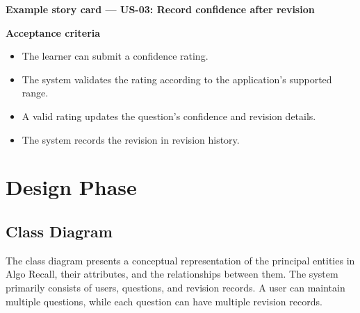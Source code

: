 \documentclass[12pt,a4paper]{report}
\begin{document}
\textbf{Example story card — US-03: Record confidence after revision}

\textbf{Acceptance criteria}
\begin{itemize}
\item The learner can submit a confidence rating.
\item The system validates the rating according to the application's supported range.
\item A valid rating updates the question's confidence and revision details.
\item The system records the revision in revision history.
\end{itemize}


\chapter{Design Phase}


\section{Class Diagram}

The class diagram presents a conceptual representation of
the principal entities in Algo Recall, their attributes,
and the relationships between them. The system primarily
consists of users, questions, and revision records.
A user can maintain multiple questions, while each
question can have multiple revision records.

\needspace{10cm}
\end{document}
